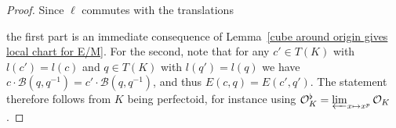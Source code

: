 \documentclass[11pt,oneside]{amsart}
\theoremstyle{definition}
\theoremstyle{remark}
\begin{document}
	\begin{proof}
		Since $\ell$ commutes with the translations
		\begin{center}
		\end{center}
		the first part is an immediate consequence of Lemma~\ref{cube around origin gives local chart for E/M}. For the second, note that for any $c'\in T(K)$ with $l(c')=l(c)$ and $q\in T(K)$ with $l(q')=l(q)$ we have $c\cdot \mathcal B(q,q^{-1}) = c'\cdot \mathcal B(q,q^{-1})$, and thus $E(c,q)=E(c',q')$. The statement therefore follows from $K$ being perfectoid, for instance using $\mathcal O_K^\flat = \varprojlim_{x\mapsto x^p}\mathcal O_K$.
	\end{proof}
	 
\end{document}
